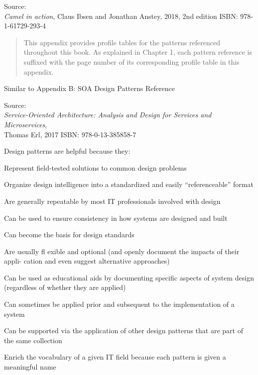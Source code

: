 \documentclass[Screen16to9,17pt]{foils}
\begin{document}
Source: {\footnotesize\\
\emph{Camel in action}, Claus Ibsen and Jonathan Anstey, 2018, 2nd edition
ISBN: 978-1-61729-293-4}




\begin{quote}
This appendix provides profile tables for the patterns referenced throughout this
book. As explained in Chapter 1, each pattern reference is suffixed with the page
number of its corresponding profile table in this appendix.
\end{quote}

Similar to Appendix B: SOA Design Patterns Reference

Source: {\footnotesize\\
\emph{Service‑Oriented Architecture: Analysis and Design for Services and Microservices},\\ Thomas Erl, 2017
ISBN: 978-0-13-385858-7}


Design patterns are helpful because they:
\begin{list2}
\item Represent field-tested solutions to common design problems
\item Organize design intelligence into a standardized and easily “referenceable” format
\item Are generally repeatable by most IT professionals involved with design
\item Can be used to ensure consistency in how systems are designed and built
\item Can become the basis for design standards
\item Are usually fl exible and optional (and openly document the impacts of their appli-
cation and even suggest alternative approaches)
\item Can be used as educational aids by documenting specific aspects of system design
(regardless of whether they are applied)
\item Can sometimes be applied prior and subsequent to the implementation of a system
\item Can be supported via the application of other design patterns that are part of the
same collection
\item Enrich the vocabulary of a given IT field because each pattern is given a
meaningful name
\end{list2}
\end{document}
